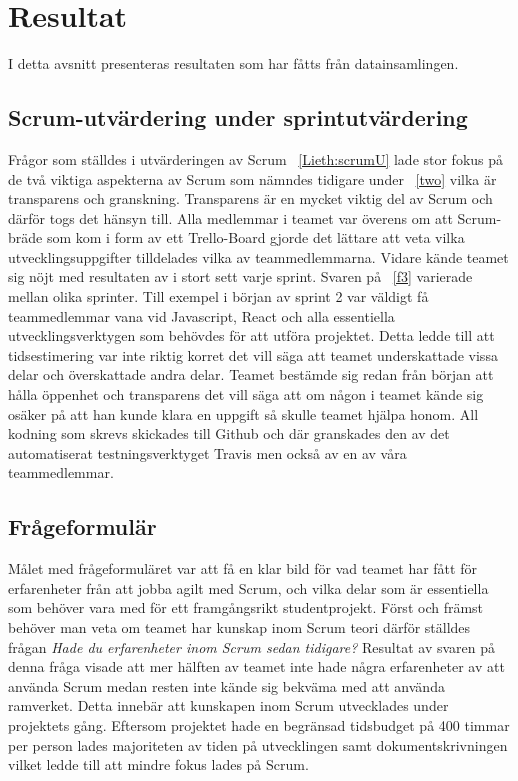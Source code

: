 \section{Resultat}
\label{sec:Lieth_Wahid-results}
I detta avsnitt presenteras resultaten som har fåtts från datainsamlingen.
\subsection{Scrum-utvärdering under sprintutvärdering}
Frågor som ställdes i utvärderingen av Scrum ~\ref{Lieth:scrumU} lade stor fokus på de två viktiga aspekterna av Scrum som nämndes tidigare under ~\ref{two} vilka är transparens och granskning.
Transparens är en mycket viktig del av Scrum och därför togs det hänsyn till. Alla medlemmar i teamet var överens om att Scrum-bräde som kom i form av ett Trello-Board gjorde det lättare att veta vilka 
utvecklingsuppgifter tilldelades vilka av teammedlemmarna. Vidare kände teamet sig nöjt med resultaten av i stort sett varje sprint. Svaren på ~\ref{f3} varierade mellan olika sprinter. Till exempel i början av sprint 2 var väldigt få teammedlemmar vana vid Javascript, React och alla essentiella utvecklingsverktygen som behövdes för att utföra projektet. Detta ledde till att tidsestimering var inte riktig korret det vill säga att teamet underskattade vissa delar och överskattade andra delar. Teamet bestämde sig redan från
början att hålla öppenhet och transparens det vill säga att om någon i teamet kände sig osäker på att han kunde klara en uppgift så skulle teamet hjälpa honom. All kodning som skrevs skickades till Github och där granskades den av det automatiserat testningsverktyget Travis men också av en av våra teammedlemmar.

\subsection{Frågeformulär}
Målet med frågeformuläret var att få en klar bild för vad teamet har fått för erfarenheter från att jobba agilt med Scrum, och vilka delar som är essentiella som behöver vara med för ett framgångsrikt studentprojekt. Först och främst behöver man veta om teamet har kunskap inom Scrum teori därför ställdes frågan \textit{Hade du erfarenheter inom Scrum sedan tidigare? } Resultat av svaren på denna fråga visade att mer hälften av teamet inte hade några erfarenheter av att använda Scrum medan resten inte kände sig bekväma med att använda ramverket. Detta innebär att kunskapen inom Scrum utvecklades under projektets gång. Eftersom projektet hade en begränsad tidsbudget på 400 timmar per person lades majoriteten av tiden på utvecklingen samt dokumentskrivningen vilket ledde till att mindre fokus lades på Scrum.  

